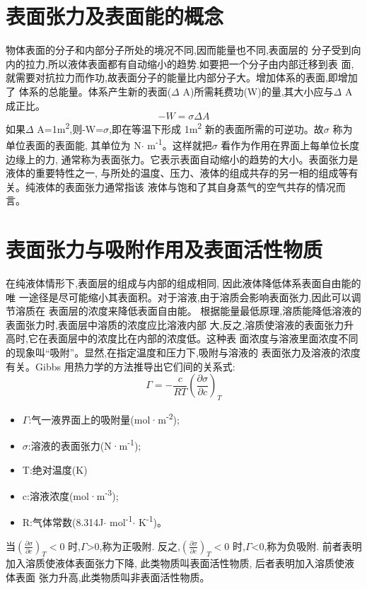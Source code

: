 \documentclass[11pt]{report}
\begin{document}
\chapter{表面张力及表面能的概念}
\label{sec:org7945991}
物体表面的分子和内部分子所处的境况不同,因而能量也不同,表面层的
分子受到向内的拉力,所以液体表面都有自动缩小的趋势.如要把一个分子由内部迁移到表
面,就需要对抗拉力而作功,故表面分子的能量比内部分子大。增加体系的表面,即增加了
体系的总能量。体系产生新的表面(\(\Delta\) A)所需耗费功(W)的量,其大小应与\(\Delta\) A 成正比。
\[
-W=\sigma \Delta A
\]
如果\(\Delta\) A=1m\textsuperscript{2},则-W=\(\sigma\),即在等温下形成 1m\textsuperscript{2}
新的表面所需的可逆功。故\(\sigma\) 称为单位表面的表面能,
其单位为 N\(\cdot\) m\textsuperscript{-1}。这样就把\(\sigma\) 看作为作用在界面上每单位长度边缘上的力,
通常称为表面张力。它表示表面自动缩小的趋势的大小。表面张力是液体的重要特性之一,
与所处的温度、压力、液体的组成共存的另一相的组成等有关。纯液体的表面张力通常指该
液体与饱和了其自身蒸气的空气共存的情况而言。
\chapter{表面张力与吸附作用及表面活性物质}
\label{sec:org8319af2}
在纯液体情形下,表面层的组成与内部的组成相同, 因此液体降低体系表面自由能的唯
一途径是尽可能缩小其表面积。对于溶液,由于溶质会影响表面张力,因此可以调节溶质在
表面层的浓度来降低表面自由能。
根据能量最低原理,溶质能降低溶液的表面张力时,表面层中溶质的浓度应比溶液内部
大,反之,溶质使溶液的表面张力升高时,它在表面层中的浓度比在内部的浓度低。这种表
面浓度与溶液里面浓度不同的现象叫“吸附”。显然,在指定温度和压力下,吸附与溶液的
表面张力及溶液的浓度有关。Gibbs 用热力学的方法推导出它们间的关系式:
\[
\Gamma = - \frac{c}{RT}	\left(\frac{\partial \sigma}{\partial c}\right)_{T}
\]

\begin{itemize}
\item \(\Gamma\):气一液界面上的吸附量(mol·m\textsuperscript{-2});
\item \(\sigma\):溶液的表面张力(N·m\textsuperscript{-1});
\item T:绝对温度(K)
\item c:溶液浓度(mol·m\textsuperscript{-3});
\item R:气体常数(8.314J\(\cdot\) mol\textsuperscript{-1}\(\cdot\) K\textsuperscript{-1})。
\end{itemize}

当\(\left(\frac{\partial \sigma}{\partial c}\right)_{T}<0\) 时,\(\Gamma\)>0,称为正吸附.
反之,\(\left(\frac{\partial \sigma}{\partial c}\right)_{T}<0\) 时,\(\Gamma\)<0,称为负吸附.
前者表明加入溶质使液体表面张力下降, 此类物质叫表面活性物质, 后者表明加入溶质使液体表面
张力升高,此类物质叫非表面活性物质。
\end{document}
